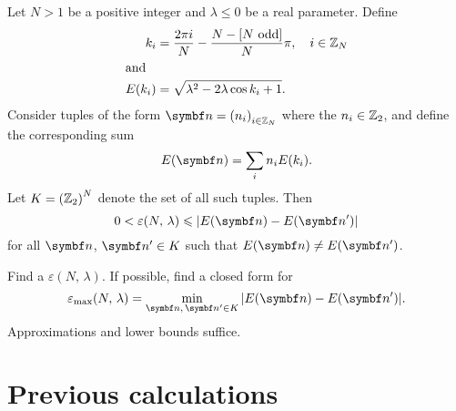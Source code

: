 \documentclass[../thesis.tex]{subfiles}
\begin{document}
\begin{thm}
  Let $N > 1$ be a positive integer and $\lambda \leqslant 0$ be a real parameter.
  Define
  \begin{align}
    k_i
    &= \frac{2\pi i}{N} - \frac{N - [\text{$N$ odd}]}{N}\pi \qc
    i \in \ZZ_N \\
    \shortintertext{and}
    E(k_i)
    &= \sqrt{\lambda^2 - 2\lambda\cos k_i + 1}.
  \end{align}
  Consider tuples of the form $\tq{n} = {\qty(n_i)}_{i \in \ZZ_N}$ where the
  $n_i \in \mathbb{Z}_2$, and define the corresponding sum
  \begin{equation}
    E(\tq{n})
    = \sum_i n_i E(k_i).
  \end{equation}
  Let $K = {\qty(\mathbb{Z}_2)}^N$ denote the set of all such tuples. Then
  \begin{equation}
    0 < \varepsilon(N,\, \lambda) \leqslant \abs{E(\tq{n}) - E(\tq{n}')}
  \end{equation}
  for all $\tq{n}$, $\tq{n'} \in K$ such that $E(\tq{n}) \neq E(\tq{n}')$.

  Find a $\varepsilon(N,\, \lambda)$. If possible, find a closed form for
  \begin{equation}
    \varepsilon_\text{max}(N,\, \lambda)
    = \min_{\tq{n},\, \tq{n}' \in K} \abs{E(\tq{n}) - E(\tq{n}')}.
  \end{equation}
  Approximations and lower bounds suffice.
\end{thm}




\section{Previous calculations}
\end{document}
